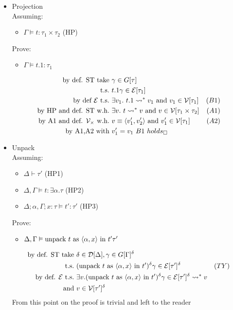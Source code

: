 \documentclass{article}
\begin{document}
\begin{itemize}
    \item Projection \\
        Assuming: \begin{itemize}
            \item $\Gamma \vDash t:\tau_1\times\tau_2$ (HP)
        \end{itemize}
        Prove: \begin{itemize}
            \item $\Gamma \vDash t.1:\tau_1$
        \end{itemize}
        \begin{align*}
            \text{by def. ST take} &\ \gamma\in G[\tau] \\
            \text{t.s.} &\ t.1\gamma \in \cE[\tau_1] \\
            \text{by def $\cE$ t.s.} &\ \exists v_1.\ t.1\leadsto^{*} v_1\AND v_1\in\V[\tau_1] & (B1) \\
            \text{by HP and def. ST w.h.} &\ \exists v.\ t\leadsto^{*} v\AND v\in\V[\tau_1\times\tau_2] & (A1) \\
            \text{by A1 and def. $\V_\times$ w.h.} &\ v\equiv \pair{v_1',v_2'} \AND v_1' \in \V[\tau_1] & (A2) \\
            \text{by A1,A2 with} &\ v_1'=v_1\ B1\ holds_\square
        \end{align*}

    \item Unpack \\
        Assuming: \begin{itemize}
            \item $\Delta \vdash \tau'$ (HP1)
            \item $\Delta,\Gamma \vDash t:\exists\alpha.\tau$ (HP2)
            \item $\Delta;\alpha,\Gamma;x : \tau\vDash t':\tau'$ (HP3)
        \end{itemize}
        Prove: \begin{itemize}
            \item $\Delta,\Gamma\vDash \text{unpack } t \text{ as }\langle \alpha,x \rangle\text{ in }t' \tau'$
        \end{itemize}
        \begin{align*}
            \text{by  def. ST take} &\ \delta\in\cD[\Delta],\gamma\in G[\Gamma]^\delta \\
            \text{t.s.} &\ (\unpack{t}{\alpha,x}{t'})^\delta\gamma\in\cE[\tau']^\delta & (TY) \\
            \text{by def. $\cE$ t.s.} &\ \exists v.(\unpack{t}{\alpha,x}{t'})^\delta\gamma\in\cE[\tau']^\delta \leadsto^{*} v \\
            \text{and}                &\ v\in\V[\tau']^\delta \\
        \end{align*}
        From this point on the proof is trivial and left to the reader
\end{itemize}
\end{document}
